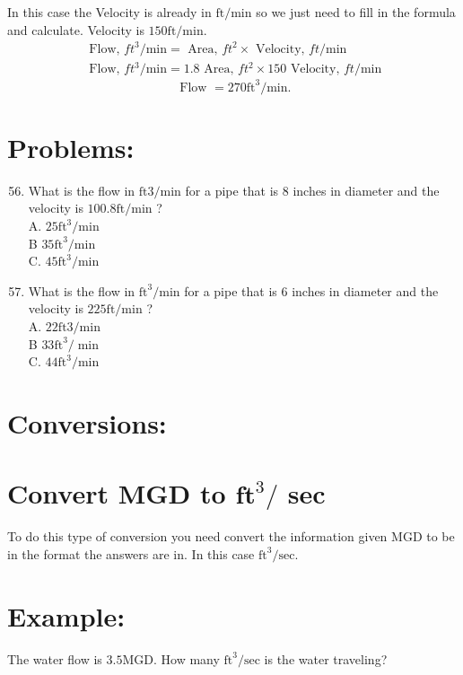 \documentclass[10pt]{article}
\begin{document}
In this case the Velocity is already in $\mathrm{ft} / \mathrm{min}$ so we just need to fill in the formula and calculate. Velocity is $150 \mathrm{ft} / \mathrm{min}$.
$$
\begin{gathered}
\text { Flow, } f t^{3} / \mathrm{min}=\text { Area, } f t^{2} \times \text { Velocity, } f t / \mathrm{min} \\
\text { Flow, } f t^{3} / \mathrm{min}=1.8 \text { Area, } f t^{2} \times 150 \text { Velocity, } f t / \mathrm{min}
\end{gathered}
$$
$$
\text { Flow }=270 \mathrm{ft}^{3} / \mathrm{min} .
$$

\section{Problems:}
\begin{enumerate}
  \setcounter{enumi}{55}
  \item What is the flow in $\mathrm{ft} 3 / \mathrm{min}$ for a pipe that is 8 inches in diameter and the velocity is $100.8 \mathrm{ft} / \mathrm{min}$ ?\\
A. $25 \mathrm{ft}^{3} / \mathrm{min}$\\
B $35 \mathrm{ft}^{3} / \mathrm{min}$\\
C. $45 \mathrm{ft}^{3} / \mathrm{min}$

  \item What is the flow in $\mathrm{ft}^{3} / \mathrm{min}$ for a pipe that is 6 inches in diameter and the velocity is $225 \mathrm{ft} / \mathrm{min}$ ?\\
A. $22 \mathrm{ft} 3 / \mathrm{min}$\\
B $33 \mathrm{ft}^{3} / \min$\\
C. $44 \mathrm{ft}^{3} / \mathrm{min}$

\end{enumerate}
\section{Conversions:}
\section{Convert MGD to $\mathbf{f t}^{3} /$ sec}
To do this type of conversion you need convert the information given MGD to be in the format the answers are in. In this case $\mathrm{ft}^{3} / \mathrm{sec}$.

\section{Example:}
The water flow is $3.5 \mathrm{MGD}$. How many $\mathrm{ft}^{3} / \mathrm{sec}$ is the water traveling?
\end{document}
